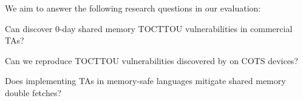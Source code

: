 \documentclass[conference]{IEEEtran} %
\newcommand{\sysname}{ScHMuzz\xspace}
\providecommand{\DIFdeltex}[1]{{\protect\color{red} \scriptsize #1}} %
\providecommand{\DIFdelbegin}{} %
\providecommand{\DIFdelend}{} %
\providecommand{\DIFdel}[1]{\texorpdfstring{\DIFdeltex{#1}}{}} %
\begin{document}


\DIFdelbegin \DIFdel{We aim to answer the following research questions in our evaluation:
}%
\DIFdelend %

\DIFdelbegin %
\DIFdel{Can }%
\DIFdel{discover 0-day shared memory TOCTTOU vulnerabilities in commercial TAs?
}\DIFdelend %

\DIFdelbegin %
\DIFdel{Can we reproduce TOCTTOU vulnerabilities discovered by }%
\DIFdel{on COTS devices? 
        }\DIFdelend %

\DIFdelbegin %
\DIFdel{Does implementing TAs in memory-safe languages mitigate shared memory double fetches?
}\DIFdelend %

\DIFdelbegin %
\DIFdelend %

\end{document}
